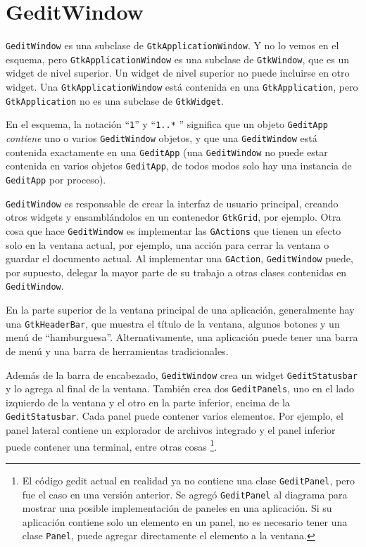 \section{GeditWindow}

\lstinline{GeditWindow} es una subclase de \lstinline{GtkApplicationWindow}. Y no lo vemos en el esquema, pero \lstinline{GtkApplicationWindow} es una subclase de \lstinline{GtkWindow}, que es un widget de nivel superior. Un widget de nivel superior no puede incluirse en otro widget. Una \lstinline{GtkApplicationWindow} está contenida en una \lstinline{GtkApplication}, pero \lstinline{GtkApplication} no es una subclase de \lstinline{GtkWidget}.

En el esquema, la notación ``\texttt{1}'' y ``\texttt{1..*} '' significa que un objeto \lstinline{GeditApp} \emph{contiene} uno o varios \lstinline{GeditWindow} objetos, y que una \lstinline{GeditWindow} está contenida exactamente en una \lstinline{GeditApp} (una \lstinline{GeditWindow} no puede estar contenida en varios objetos \lstinline{GeditApp}, de todos modos solo hay una instancia de \lstinline{GeditApp} por proceso).

\lstinline{GeditWindow} es responsable de crear la interfaz de usuario principal, creando otros widgets y ensamblándolos en un contenedor \lstinline{GtkGrid}, por ejemplo. Otra cosa que hace \lstinline{GeditWindow} es implementar las \lstinline{GActions} que tienen un efecto solo en la ventana actual, por ejemplo, una acción para cerrar la ventana o guardar el documento actual. Al implementar una \lstinline{GAction}, \lstinline{GeditWindow} puede, por supuesto, delegar la mayor parte de su trabajo a otras clases contenidas en \lstinline{GeditWindow}.

En la parte superior de la ventana principal de una aplicación, generalmente hay una \lstinline{GtkHeaderBar}, que muestra el título de la ventana, algunos botones y un menú de ``hamburguesa''. Alternativamente, una aplicación puede tener una barra de menú y una barra de herramientas tradicionales.

Además de la barra de encabezado, \lstinline{GeditWindow} crea un widget \lstinline{GeditStatusbar} y lo agrega al final de la ventana. También crea dos \lstinline{GeditPanels}, uno en el lado izquierdo de la ventana y el otro en la parte inferior, encima de la \lstinline{GeditStatusbar}. Cada panel puede contener varios elementos. Por ejemplo, el panel lateral contiene un explorador de archivos integrado y el panel inferior puede contener una terminal, entre otras cosas \footnote{El código gedit actual en realidad ya no contiene una clase \lstinline{GeditPanel}, pero fue el caso en una versión anterior. Se agregó \lstinline{GeditPanel} al diagrama para mostrar una posible implementación de paneles en una aplicación. Si su aplicación contiene solo un elemento en un panel, no es necesario tener una clase \lstinline{Panel}, puede agregar directamente el elemento a la ventana.}.

